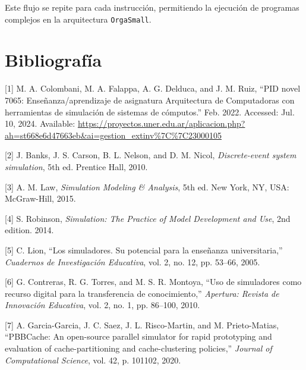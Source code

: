 \documentclass[12pt,twoside]{templates/unerthesis}
\newenvironment{cslreferences}%
  {}%
  {\par}
\begin{document}
Este flujo se repite para cada instrucción, permitiendo la ejecución de programas complejos en la arquitectura \texttt{OrgaSmall}.

\hypertarget{bibliografuxeda}{%
\chapter*{Bibliografía}\label{bibliografuxeda}}

\hypertarget{refs}{}
\begin{cslreferences}
\leavevmode\hypertarget{ref-colombani_pid_2022}{}%
{[}1{]} M. A. Colombani, M. A. Falappa, A. G. Delduca, and J. M. Ruiz, ``PID novel 7065: Enseñanza/aprendizaje de asignatura Arquitectura de Computadoras con herramientas de simulación de sistemas de cómputos.'' Feb. 2022. Accessed: Jul. 10, 2024. Available: \url{https://proyectos.uner.edu.ar/aplicacion.php?ah=st668e6d47663eb\&ai=gestion_extinv\%7C\%7C23000105}

\leavevmode\hypertarget{ref-banks_discrete-event_2010}{}%
{[}2{]} J. Banks, J. S. Carson, B. L. Nelson, and D. M. Nicol, \emph{Discrete-event system simulation}, 5th ed. Prentice Hall, 2010.

\leavevmode\hypertarget{ref-law_simulation_2015}{}%
{[}3{]} A. M. Law, \emph{Simulation Modeling \& Analysis}, 5th ed. New York, NY, USA: McGraw-Hill, 2015.

\leavevmode\hypertarget{ref-robinson_simulation_2014}{}%
{[}4{]} S. Robinson, \emph{Simulation: The Practice of Model Development and Use}, 2nd edition. 2014.

\leavevmode\hypertarget{ref-lion_simuladores_2005}{}%
{[}5{]} C. Lion, ``Los simuladores. Su potencial para la enseñanza universitaria,'' \emph{Cuadernos de Investigación Educativa}, vol. 2, no. 12, pp. 53--66, 2005.

\leavevmode\hypertarget{ref-contreras_uso_2010}{}%
{[}6{]} G. Contreras, R. G. Torres, and M. S. R. Montoya, ``Uso de simuladores como recurso digital para la transferencia de conocimiento,'' \emph{Apertura: Revista de Innovación Educativa}, vol. 2, no. 1, pp. 86--100, 2010.

\leavevmode\hypertarget{ref-garcia-garcia_pbbcache_2020}{}%
{[}7{]} A. Garcia-Garcia, J. C. Saez, J. L. Risco-Martin, and M. Prieto-Matias, ``PBBCache: An open-source parallel simulator for rapid prototyping and evaluation of cache-partitioning and cache-clustering policies,'' \emph{Journal of Computational Science}, vol. 42, p. 101102, 2020.


\end{cslreferences}
\end{document}

